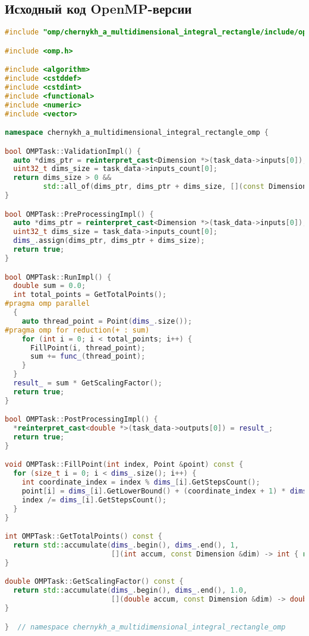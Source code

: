 \documentclass[a4paper,12pt]{article}
\begin{document}
  \subsection{Исходный код OpenMP-версии}\label{subsec:openmp}

  \begin{lstlisting}[language=C++,label={lst:openmp}]
#include "omp/chernykh_a_multidimensional_integral_rectangle/include/ops_omp.hpp"

#include <omp.h>

#include <algorithm>
#include <cstddef>
#include <cstdint>
#include <functional>
#include <numeric>
#include <vector>

namespace chernykh_a_multidimensional_integral_rectangle_omp {

bool OMPTask::ValidationImpl() {
  auto *dims_ptr = reinterpret_cast<Dimension *>(task_data->inputs[0]);
  uint32_t dims_size = task_data->inputs_count[0];
  return dims_size > 0 &&
         std::all_of(dims_ptr, dims_ptr + dims_size, [](const Dimension &dim) -> bool { return dim.IsValid(); });
}

bool OMPTask::PreProcessingImpl() {
  auto *dims_ptr = reinterpret_cast<Dimension *>(task_data->inputs[0]);
  uint32_t dims_size = task_data->inputs_count[0];
  dims_.assign(dims_ptr, dims_ptr + dims_size);
  return true;
}

bool OMPTask::RunImpl() {
  double sum = 0.0;
  int total_points = GetTotalPoints();
#pragma omp parallel
  {
    auto thread_point = Point(dims_.size());
#pragma omp for reduction(+ : sum)
    for (int i = 0; i < total_points; i++) {
      FillPoint(i, thread_point);
      sum += func_(thread_point);
    }
  }
  result_ = sum * GetScalingFactor();
  return true;
}

bool OMPTask::PostProcessingImpl() {
  *reinterpret_cast<double *>(task_data->outputs[0]) = result_;
  return true;
}

void OMPTask::FillPoint(int index, Point &point) const {
  for (size_t i = 0; i < dims_.size(); i++) {
    int coordinate_index = index % dims_[i].GetStepsCount();
    point[i] = dims_[i].GetLowerBound() + (coordinate_index + 1) * dims_[i].GetStepSize();
    index /= dims_[i].GetStepsCount();
  }
}

int OMPTask::GetTotalPoints() const {
  return std::accumulate(dims_.begin(), dims_.end(), 1,
                         [](int accum, const Dimension &dim) -> int { return accum * dim.GetStepsCount(); });
}

double OMPTask::GetScalingFactor() const {
  return std::accumulate(dims_.begin(), dims_.end(), 1.0,
                         [](double accum, const Dimension &dim) -> double { return accum * dim.GetStepSize(); });
}

}  // namespace chernykh_a_multidimensional_integral_rectangle_omp
  \end{lstlisting}
\end{document}
